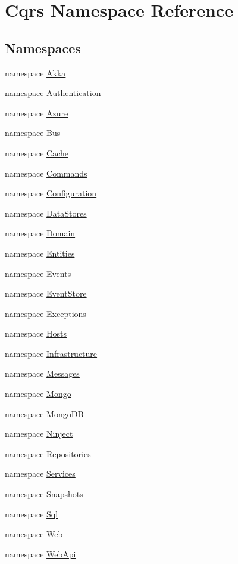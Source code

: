 \hypertarget{namespaceCqrs}{}\section{Cqrs Namespace Reference}
\label{namespaceCqrs}
\subsection*{Namespaces}
\begin{DoxyCompactItemize}
\item 
namespace \hyperlink{namespaceCqrs_1_1Akka}{Akka}
\item 
namespace \hyperlink{namespaceCqrs_1_1Authentication}{Authentication}
\item 
namespace \hyperlink{namespaceCqrs_1_1Azure}{Azure}
\item 
namespace \hyperlink{namespaceCqrs_1_1Bus}{Bus}
\item 
namespace \hyperlink{namespaceCqrs_1_1Cache}{Cache}
\item 
namespace \hyperlink{namespaceCqrs_1_1Commands}{Commands}
\item 
namespace \hyperlink{namespaceCqrs_1_1Configuration}{Configuration}
\item 
namespace \hyperlink{namespaceCqrs_1_1DataStores}{Data\+Stores}
\item 
namespace \hyperlink{namespaceCqrs_1_1Domain}{Domain}
\item 
namespace \hyperlink{namespaceCqrs_1_1Entities}{Entities}
\item 
namespace \hyperlink{namespaceCqrs_1_1Events}{Events}
\item 
namespace \hyperlink{namespaceCqrs_1_1EventStore}{Event\+Store}
\item 
namespace \hyperlink{namespaceCqrs_1_1Exceptions}{Exceptions}
\item 
namespace \hyperlink{namespaceCqrs_1_1Hosts}{Hosts}
\item 
namespace \hyperlink{namespaceCqrs_1_1Infrastructure}{Infrastructure}
\item 
namespace \hyperlink{namespaceCqrs_1_1Messages}{Messages}
\item 
namespace \hyperlink{namespaceCqrs_1_1Mongo}{Mongo}
\item 
namespace \hyperlink{namespaceCqrs_1_1MongoDB}{Mongo\+DB}
\item 
namespace \hyperlink{namespaceCqrs_1_1Ninject}{Ninject}
\item 
namespace \hyperlink{namespaceCqrs_1_1Repositories}{Repositories}
\item 
namespace \hyperlink{namespaceCqrs_1_1Services}{Services}
\item 
namespace \hyperlink{namespaceCqrs_1_1Snapshots}{Snapshots}
\item 
namespace \hyperlink{namespaceCqrs_1_1Sql}{Sql}
\item 
namespace \hyperlink{namespaceCqrs_1_1Web}{Web}
\item 
namespace \hyperlink{namespaceCqrs_1_1WebApi}{Web\+Api}
\end{DoxyCompactItemize}
